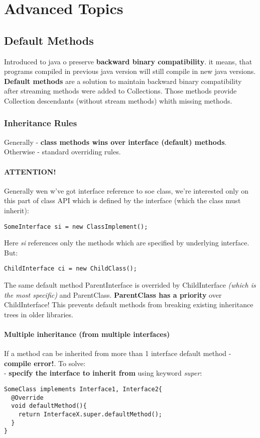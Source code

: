 \documentclass{report}
\begin{document}
\chapter{Advanced Topics}
\section{Default Methods}
Introduced to java o preserve \textbf{backward binary compatibility}. it means, that programs compiled in previous java version will still compile in new java versions. \textbf{Default methods} are a solution to maintain backward binary compatibility after streaming methods were added to Collections. Those methods provide Collection descendants (without stream methods) whith missing methods.
\subsection*{Inheritance Rules}
Generally - \textbf{class methods wins over interface (default) methods}. Otherwise - standard overriding rules.
\subsubsection*{\textbf{ATTENTION!}}
Generally wen w've got interface reference to soe class, we're interested only on this part of class API which is defined by the interface (which the class must inherit):
\begin{verbatim}
SomeInterface si = new ClassImplement();
\end{verbatim}
Here \textit{si} references only the methods which are specified by underlying interface.
But:
\begin{verbatim}
ChildInterface ci = new ChildClass();
\end{verbatim}
The same default method ParentInterface is overrided by ChildInterface \textit{(which is the most specific)} and ParentClass. \textbf{ParentClass has a priority} over ChildInterface! This prevents default methods from breaking existing inheritance trees in older libraries.

\subsubsection{Multiple inheritance (from multiple interfaces)}
If a method can be inherited from more than 1 interface default method - \textbf{compile error!}. To solve:\\
- \textbf{specify the interface to inherit from} using keyword \textit{super}:
\begin{verbatim}
SomeClass implements Interface1, Interface2{
  @Override
  void defaultMethod(){
    return InterfaceX.super.defaultMethod();
  }
}
\end{verbatim}
\end{document}
